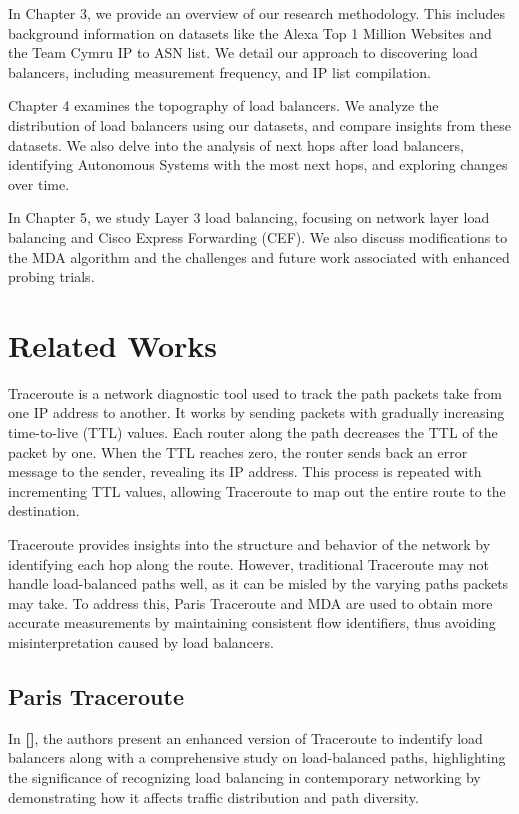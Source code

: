 \documentclass[12pt]{cwru_thesis}
\begin{document}
In Chapter 3, we provide an overview of our research methodology. This includes background information on datasets like the Alexa Top 1 Million Websites and the Team Cymru IP to ASN list. We detail our approach to discovering load balancers, including measurement frequency, and IP list compilation.

Chapter 4 examines the topography of load balancers. We analyze the distribution of load balancers using our datasets, and compare insights from these datasets. We also delve into the analysis of next hops after load balancers, identifying Autonomous Systems with the most next hops, and exploring changes over time.

In Chapter 5, we study Layer 3 load balancing, focusing on network layer load balancing and Cisco Express Forwarding (CEF). We also discuss modifications to the MDA algorithm and the challenges and future work associated with enhanced probing trials.










\chapter{Related Works}

Traceroute is a network diagnostic tool used to track the path packets take from one IP address to another. It works by sending packets with gradually increasing time-to-live (TTL) values. Each router along the path decreases the TTL of the packet by one. When the TTL reaches zero, the router sends back an error message to the sender, revealing its IP address. This process is repeated with incrementing TTL values, allowing Traceroute to map out the entire route to the destination.

Traceroute provides insights into the structure and behavior of the network by identifying each hop along the route. However, traditional Traceroute may not handle load-balanced paths well, as it can be misled by the varying paths packets may take. To address this, Paris Traceroute and MDA are used to obtain more accurate measurements by maintaining consistent flow identifiers, thus avoiding misinterpretation caused by load balancers.

\section{Paris Traceroute}
In \textbf{[\cite{4261334}]}, the authors present an enhanced version of Traceroute to indentify load balancers along with a comprehensive study on load-balanced paths, highlighting the significance of recognizing load balancing in contemporary networking by demonstrating how it affects traffic distribution and path diversity. 
\end{document}
